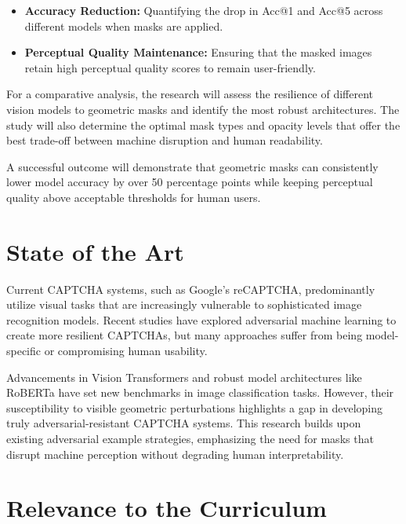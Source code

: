 \documentclass[a4paper,11pt]{article}
\begin{document}
\begin{itemize}
    \item \textbf{Accuracy Reduction:} Quantifying the drop in Acc@1 and Acc@5 across different models when masks are applied.
    \item \textbf{Perceptual Quality Maintenance:} Ensuring that the masked images retain high perceptual quality scores to remain user-friendly.
\end{itemize}

For a comparative analysis, the research will assess the resilience of different vision models to geometric masks and identify the most robust architectures. The study will also determine the optimal mask types and opacity levels that offer the best trade-off between machine disruption and human readability.

A successful outcome will demonstrate that geometric masks can consistently lower model accuracy by over 50 percentage points while keeping perceptual quality above acceptable thresholds for human users.

\section*{State of the Art}

Current CAPTCHA systems, such as Google's reCAPTCHA, predominantly utilize visual tasks that are increasingly vulnerable to sophisticated image recognition models. Recent studies have explored adversarial machine learning to create more resilient CAPTCHAs, but many approaches suffer from being model-specific or compromising human usability.


Advancements in Vision Transformers and robust model architectures like RoBERTa have set new benchmarks in image classification tasks. However, their susceptibility to visible geometric perturbations highlights a gap in developing truly adversarial-resistant CAPTCHA systems. This research builds upon existing adversarial example strategies, emphasizing the need for masks that disrupt machine perception without degrading human interpretability.

\section*{Relevance to the Curriculum}
\end{document}

